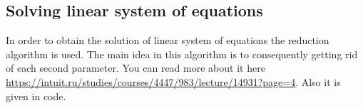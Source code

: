 \documentclass[12pt, letterpaper]{article}
\begin{document}
	\subsection{Solving linear system of equations}
	In order to obtain the solution of linear system of equations the reduction algorithm is used.
	The main idea in this algorithm is to consequently getting rid of each second parameter. You can read more about it here \url{https://intuit.ru/studies/courses/4447/983/lecture/14931?page=4}. Also it is given in code.
	
	
\end{document}
